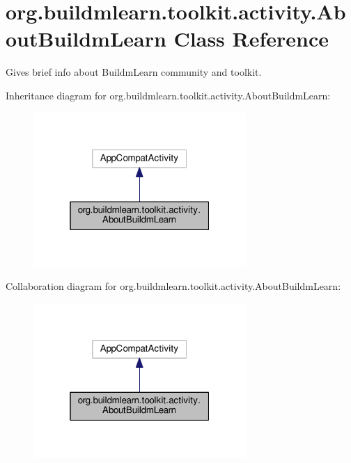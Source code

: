 \hypertarget{classorg_1_1buildmlearn_1_1toolkit_1_1activity_1_1AboutBuildmLearn}{}\section{org.\+buildmlearn.\+toolkit.\+activity.\+About\+Buildm\+Learn Class Reference}
\label{classorg_1_1buildmlearn_1_1toolkit_1_1activity_1_1AboutBuildmLearn}


Gives brief info about Buildm\+Learn community and toolkit.  




Inheritance diagram for org.\+buildmlearn.\+toolkit.\+activity.\+About\+Buildm\+Learn\+:
\nopagebreak
\begin{figure}[H]
\begin{center}
\leavevmode
\includegraphics[width=229pt]{classorg_1_1buildmlearn_1_1toolkit_1_1activity_1_1AboutBuildmLearn__inherit__graph}
\end{center}
\end{figure}


Collaboration diagram for org.\+buildmlearn.\+toolkit.\+activity.\+About\+Buildm\+Learn\+:
\nopagebreak
\begin{figure}[H]
\begin{center}
\leavevmode
\includegraphics[width=229pt]{classorg_1_1buildmlearn_1_1toolkit_1_1activity_1_1AboutBuildmLearn__coll__graph}
\end{center}
\end{figure}

